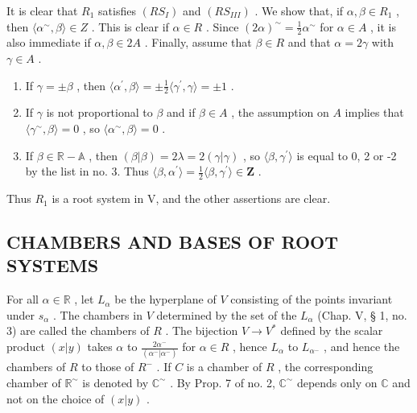It is clear that \(R_{1}\) satisfies \((RS_{I})\) and \((RS_{III})\) . We show that, if \(\alpha, \beta \in R_{1}\) , then \(\langle\alpha^{\sim}, \beta\rangle \in Z\) . This is clear if \(\alpha \in R\) . Since \((2\alpha)^{\sim} = \frac{1}{2}\alpha^{\sim}\) for \(\alpha \in A\) , it is also immediate if \(\alpha, \beta \in 2A\) . Finally, assume that \(\beta \in R\) and that \(\alpha = 2\gamma\) with \(\gamma \in A\) .

\begin{enumerate}
\def\labelenumi{\arabic{enumi})}
\item
  If \(\gamma = \pm \beta\) , then \(\langle \alpha^{\prime},\beta \rangle = \pm \frac{1}{2}\langle \gamma^{\prime},\gamma \rangle = \pm 1\) .
\item
  If \(\gamma\) is not proportional to \(\beta\) and if \(\beta \in A\) , the assumption on \(A\) implies that \(\langle \gamma^{\sim},\beta \rangle = 0\) , so \(\langle \alpha^{\sim},\beta \rangle = 0\) .
\item
  If \(\beta \in \mathbb{R} - \mathbb{A}\) , then \((\beta |\beta) = 2\lambda = 2(\gamma |\gamma)\) , so \(\langle \beta, \gamma^{\prime} \rangle\) is equal to 0, 2 or -2 by the list in no. 3. Thus \(\langle \beta, \alpha^{\prime} \rangle = \frac{1}{2}\langle \beta, \gamma^{\prime} \rangle \in \mathbf{Z}\) .
\end{enumerate}

Thus \(R_{1}\) is a root system in V, and the other assertions are clear.

\subsection{CHAMBERS AND BASES OF ROOT SYSTEMS}

For all \(\alpha \in \mathbb{R}\) , let \(L_{\alpha}\) be the hyperplane of \(V\) consisting of the points invariant under \(s_{\alpha}\) . The chambers in \(V\) determined by the set of the \(L_{\alpha}\) (Chap. V, § 1, no. 3) are called the chambers of \(R\) . The bijection \(V \to V^{*}\) defined by the scalar product \((x|y)\) takes \(\alpha\) to \(\frac{2\alpha^{-}}{(\alpha^{-}|\alpha^{-})}\) for \(\alpha \in R\) , hence \(L_{\alpha}\) to \(L_{\alpha^{-}}\) , and hence the chambers of \(R\) to those of \(R^{-}\) . If \(C\) is a chamber of \(R\) , the corresponding chamber of \(\mathbb{R}^{\sim}\) is denoted by \(\mathbb{C}^{\sim}\) . By Prop. 7 of no. 2, \(\mathbb{C}^{\sim}\) depends only on \(\mathbb{C}\) and not on the choice of \((x|y)\) .

